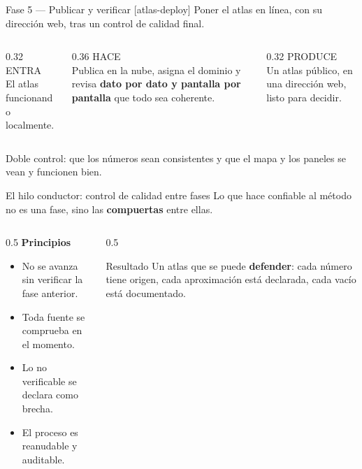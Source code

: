 \documentclass[aspectratio=169,11pt]{beamer}
\newcommand{\skilltag}[1]{{\color{tAccentD}\ttfamily\footnotesize[#1]}}
\newcommand{\lead}[1]{{\color{tPrimary}\large #1}\par\medskip}
\newcommand{\ehs}[3]{%
\begin{columns}[T]
  \begin{column}{0.32\textwidth}
    {\color{tMuted}\ttfamily\footnotesize ENTRA}\\[2pt]{\small #1}
  \end{column}
  \begin{column}{0.36\textwidth}
    {\color{tMuted}\ttfamily\footnotesize HACE}\\[2pt]{\small #2}
  \end{column}
  \begin{column}{0.32\textwidth}
    {\color{tMuted}\ttfamily\footnotesize PRODUCE}\\[2pt]{\small #3}
  \end{column}
\end{columns}}
\begin{document}
\begin{frame}{Fase 5 — Publicar y verificar \skilltag{atlas-deploy}}
\lead{Poner el atlas en línea, con su dirección web, tras un control de calidad final.}
\ehs{El atlas funcionando localmente.}{Publica en la nube, asigna el dominio y revisa \textbf{dato por dato y pantalla por pantalla} que todo sea coherente.}{Un atlas público, en una dirección web, listo para decidir.}
\vfill
{\footnotesize\color{tMuted} Doble control: que los números sean consistentes y que el mapa y los paneles se vean y funcionen bien.}
\end{frame}

\begin{frame}{El hilo conductor: control de calidad entre fases}
\lead{Lo que hace confiable al método no es una fase, sino las \textbf{compuertas} entre ellas.}
\begin{columns}[T]
\begin{column}{0.5\textwidth}
\textbf{\color{tPrimary}Principios}
\begin{itemize}\footnotesize
  \item No se avanza sin verificar la fase anterior.
  \item Toda fuente se comprueba en el momento.
  \item Lo no verificable se declara como brecha.
  \item El proceso es reanudable y auditable.
\end{itemize}
\end{column}
\begin{column}{0.5\textwidth}
\begin{block}{Resultado}
Un atlas que se puede \textbf{defender}: cada número tiene origen, cada aproximación está declarada, cada vacío está documentado.
\end{block}
\end{column}
\end{columns}
\end{frame}
\end{document}
